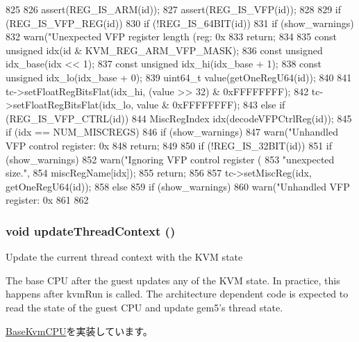 \begin{DoxyCode}
825 {
826     assert(REG_IS_ARM(id));
827     assert(REG_IS_VFP(id));
828 
829     if (REG_IS_VFP_REG(id)) {
830         if (!REG_IS_64BIT(id)) {
831             if (show_warnings)
832                 warn("Unexpected VFP register length (reg: 0x%
833             return;
834         }
835         const unsigned idx(id & KVM_REG_ARM_VFP_MASK);
836         const unsigned idx_base(idx << 1);
837         const unsigned idx_hi(idx_base + 1);
838         const unsigned idx_lo(idx_base + 0);
839         uint64_t value(getOneRegU64(id));
840 
841         tc->setFloatRegBitsFlat(idx_hi, (value >> 32) & 0xFFFFFFFF);
842         tc->setFloatRegBitsFlat(idx_lo, value & 0xFFFFFFFF);
843     } else if (REG_IS_VFP_CTRL(id)) {
844         MiscRegIndex idx(decodeVFPCtrlReg(id));
845         if (idx == NUM_MISCREGS) {
846             if (show_warnings)
847                 warn("Unhandled VFP control register: 0x%
848             return;
849         }
850         if (!REG_IS_32BIT(id)) {
851             if (show_warnings)
852                 warn("Ignoring VFP control register (%
853                      "unexpected size.\n",
854                      miscRegName[idx]);
855             return;
856         }
857         tc->setMiscReg(idx, getOneRegU64(id));
858     } else {
859         if (show_warnings)
860             warn("Unhandled VFP register: 0x%
861     }
862 }
\end{DoxyCode}
\hypertarget{classArmKvmCPU_adbd5e38eae7c8c3021f2c4f430b399fd}{
\subsubsection[{updateThreadContext}]{\setlength{\rightskip}{0pt plus 5cm}void updateThreadContext ()}}
\label{classArmKvmCPU_adbd5e38eae7c8c3021f2c4f430b399fd}
Update the current thread context with the KVM state

The base CPU after the guest updates any of the KVM state. In practice, this happens after kvmRun is called. The architecture dependent code is expected to read the state of the guest CPU and update gem5's thread state. 

\hyperlink{classBaseKvmCPU_ac47bfb587580ca76050e0c9bc753c10d}{BaseKvmCPU}を実装しています。


